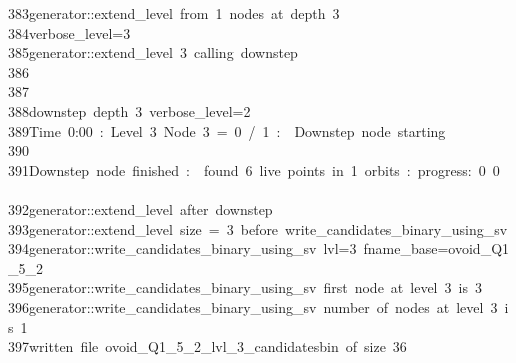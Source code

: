 \begin{tabbing}
383\>generator::extend\_level\ from\ 1\ nodes\ at\ depth\ 3\\[0pt]
384\>verbose\_level=3\\[0pt]
385\>generator::extend\_level\ 3\ calling\ downstep\\[0pt]
386\>\\[0pt]
387\>\\[0pt]
388\>downstep\ depth\ 3\ verbose\_level=2\\[0pt]
389\>Time\ 0:00\ :\ Level\ 3\ Node\ 3\ =\ 0\ /\ 1\ :\ \ Downstep\ node\ starting\\[0pt]
390\>\\[0pt]
391\>Downstep\ node\ finished\ :\ \ found\ 6\ live\ points\ in\ 1\ orbits\ :\ progress:\ 0\ 0\ \ \\[0pt]
392\>generator::extend\_level\ after\ downstep\\[0pt]
393\>generator::extend\_level\ size\ =\ 3\ before\ write\_candidates\_binary\_using\_sv\\[0pt]
394\>generator::write\_candidates\_binary\_using\_sv\ lvl=3\ fname\_base=ovoid\_Q1\_5\_2\\[0pt]
395\>generator::write\_candidates\_binary\_using\_sv\ first\ node\ at\ level\ 3\ is\ 3\\[0pt]
396\>generator::write\_candidates\_binary\_using\_sv\ number\ of\ nodes\ at\ level\ 3\ is\ 1\\[0pt]
397\>written\ file\ ovoid\_Q1\_5\_2\_lvl\_3\_candidatesbin\ of\ size\ 36\\[0pt]

\end{tabbing}
